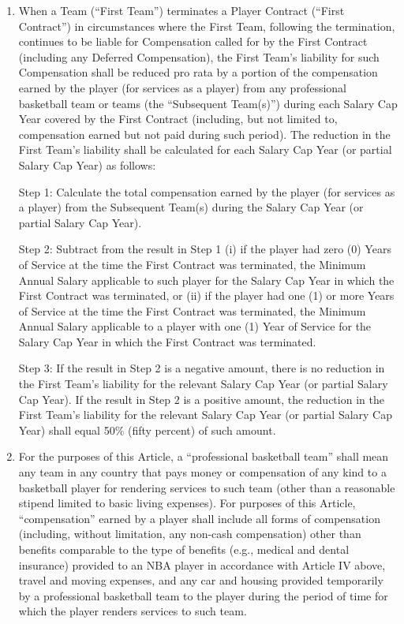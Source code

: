 \documentclass[
]{book}
\begin{document}
\begin{enumerate}
\def\labelenumi{(\alph{enumi})}
\item
  When a Team (``First Team'') terminates a Player Contract (``First Contract'') in circumstances where the First Team, following the termination, continues to be liable for Compensation called for by the First Contract (including any Deferred Compensation), the First Team's liability for such Compensation shall be reduced pro rata by a portion of the compensation earned by the player (for services as a player) from any professional basketball team or teams (the ``Subsequent Team(s)'') during each Salary Cap Year covered by the First Contract (including, but not limited to, compensation earned but not paid during such period). The reduction in the First Team's liability shall be calculated for each Salary Cap Year (or partial Salary Cap Year) as follows:

  Step 1: Calculate the total compensation earned by the player (for services as a player) from the Subsequent Team(s) during the Salary Cap Year (or partial Salary Cap Year).

  Step 2: Subtract from the result in Step 1 (i) if the player had zero (0) Years of Service at the time the First Contract was terminated, the Minimum Annual Salary applicable to such player for the Salary Cap Year in which the First Contract was terminated, or (ii) if the player had one (1) or more Years of Service at the time the First Contract was terminated, the Minimum Annual Salary applicable to a player with one (1) Year of Service for the Salary Cap Year in which the First Contract was terminated.

  Step 3: If the result in Step 2 is a negative amount, there is no reduction in the First Team's liability for the relevant Salary Cap Year (or partial Salary Cap Year). If the result in Step 2 is a positive amount, the reduction in the First Team's liability for the relevant Salary Cap Year (or partial Salary Cap Year) shall equal 50\% (fifty percent) of such amount.
\item
  For the purposes of this Article, a ``professional basketball team'' shall mean any team in any country that pays money or compensation of any kind to a basketball player for rendering services to such team (other than a reasonable stipend limited to basic living expenses). For purposes of this Article, ``compensation'' earned by a player shall include all forms of compensation (including, without limitation, any non-cash compensation) other than benefits comparable to the type of benefits (e.g., medical and dental insurance) provided to an NBA player in accordance with Article IV above, travel and moving expenses, and any car and housing provided temporarily by a professional basketball team to the player during the period of time for which the player renders services to such team.
\end{enumerate}
\end{document}
